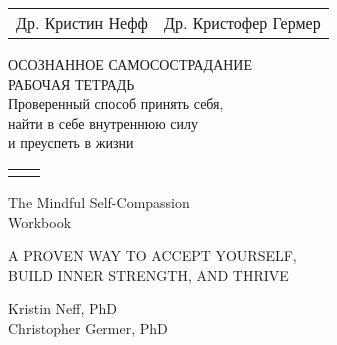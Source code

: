 
\begin{titlepage}	
	\begin{center}	
		\begin{tabularx}{\textwidth}{Xr}
			Др. Кристин Нефф & Др. Кристофер Гермер \\
		\end{tabularx}
		
		\vfill
		
		{\Huge ОСОЗНАННОЕ САМОСОСТРАДАНИЕ\\[1cm]}
		{\Large РАБОЧАЯ ТЕТРАДЬ\\[2cm]}
		{\Large Проверенный способ принять себя,\\ найти в себе внутреннюю силу\\ и преуспеть в жизни\\}
			
		\vfill
		\vfill
	\end{center}
\end{titlepage}
	
\begin{titlepage}		
	\begin{center}
		\begin{tabularx}{\textwidth}{Xr}
			 &  \\
		\end{tabularx}

		\vspace{10ex}
	
		{\Huge The Mindful Self-Compassion\\}
		{\Huge Workbook\\}
		
		\vspace{10ex}
		
		{\large A PROVEN WAY TO ACCEPT YOURSELF,\\BUILD INNER STRENGTH, AND THRIVE\\}
		
		\vfill
		
		Kristin Neff, PhD\\
		Christopher Germer, PhD	
	\end{center}
\end{titlepage}
